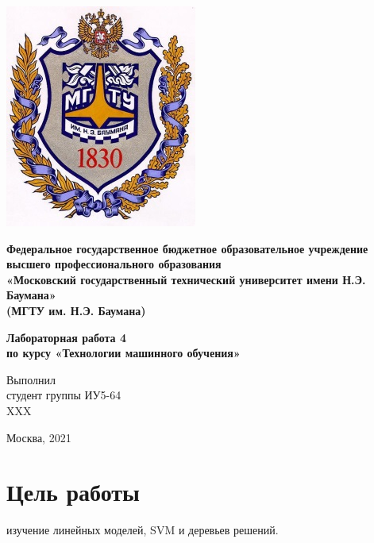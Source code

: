 \documentclass[a4paper]{article}
\begin{document}
  \fontsize{14}{16}\selectfont

  \begin{titlepage}
    \begin{minipage}{0.2\textwidth}
      \includegraphics[scale=0.4]{logo}
    \end{minipage}
    \begin{minipage}{0.7\textwidth}\centering
      \fontsize{10}{12}\selectfont
      \textbf{
        Федеральное государственное бюджетное образовательное учреждение \\
        высшего профессионального образования \\
        «Московский государственный технический университет имени Н.Э. Баумана» \\
        (МГТУ им. Н.Э. Баумана)
      }
    \end{minipage}

    \vspace{5cm}
    \centering
    \textbf{
      Лабораторная работа 4 \\
      по курсу «Технологии машинного обучения» \\
    }

    \vspace{5cm}
    \begin{flushright}
    Выполнил \\
    студент группы ИУ5-64 \\
    XXX
    \end{flushright}
    \vspace*{\fill}
    Москва, 2021
  \end{titlepage}

  \section*{Цель работы}
  изучение линейных моделей, SVM и деревьев решений.
\end{document}
